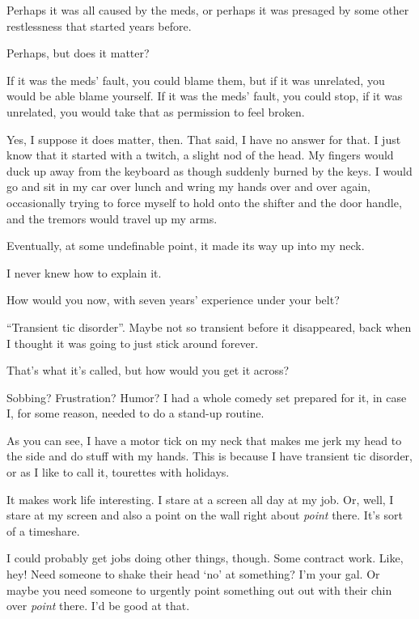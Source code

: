 \begin{paracol}{2}
\begin{leftcolumn}
\begin{ally}
Perhaps it was all caused by the meds, or perhaps it was presaged by some other restlessness that started years before.
\end{ally}
Perhaps, but does it matter?

\begin{ally}
If it was the meds' fault, you could blame them, but if it was unrelated, you would be able blame yourself. If it was the meds' fault, you could stop, if it was unrelated, you would take that as permission to feel broken.
\end{ally}
Yes, I suppose it does matter, then. That said, I have no answer for that. I just know that it started with a twitch, a slight nod of the head. My fingers would duck up away from the keyboard as though suddenly burned by the keys. I would go and sit in my car over lunch and wring my hands over and over again, occasionally trying to force myself to hold onto the shifter and the door handle, and the tremors would travel up my arms.

Eventually, at some undefinable point, it made its way up into my neck.

I never knew how to explain it.

\begin{ally}
How would you now, with seven years' experience under your belt?
\end{ally}
``Transient tic disorder''. Maybe not so transient before it disappeared, back when I thought it was going to just stick around forever.

\begin{ally}
That's what it's called, but how would you get it across?
\end{ally}
Sobbing? Frustration? Humor? I had a whole comedy set prepared for it, in case I, for some reason, needed to do a stand-up routine.

As you can see, I have a motor tick on my neck that makes me jerk my head to the side and do stuff with my hands. This is because I have transient tic disorder, or as I like to call it, tourettes with holidays.

It makes work life interesting. I stare at a screen all day at my job. Or, well, I stare at my screen and also a point on the wall right about \emph{point} there. It's sort of a timeshare.

I could probably get jobs doing other things, though. Some contract work. Like, hey! Need someone to shake their head `no' at something? I'm your gal. Or maybe you need someone to urgently point something out out with their chin over \emph{point} there. I'd be good at that.


\end{leftcolumn}
\end{paracol}
